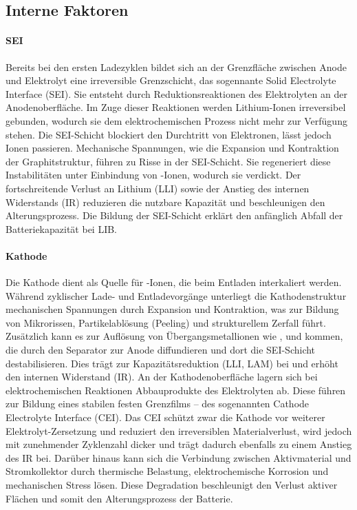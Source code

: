 \subsection{Interne Faktoren}
\paragraph{SEI} Bereits bei den ersten Ladezyklen bildet sich an der Grenzfläche zwischen Anode und Elektrolyt eine irreversible Grenzschicht, das sogennante Solid Electrolyte Interface (SEI). Sie entsteht durch Reduktionsreaktionen des Elektrolyten an der Anodenoberfläche. Im Zuge dieser Reaktionen werden Lithium-Ionen irreversibel gebunden, wodurch sie dem elektrochemischen Prozess nicht mehr zur Verfügung stehen. Die SEI-Schicht blockiert den Durchtritt von Elektronen, lässt jedoch Ionen passieren. Mechanische Spannungen, wie die Expansion und Kontraktion der Graphitstruktur, führen zu Risse in der SEI-Schicht. Sie regeneriert diese Instabilitäten unter Einbindung von -Ionen, wodurch sie verdickt. Der fortschreitende Verlust an Lithium (LLI) sowie der Anstieg des internen Widerstands (IR) reduzieren die nutzbare Kapazität und beschleunigen den Alterungsprozess. Die Bildung der SEI-Schicht erklärt den anfänglich Abfall der Batteriekapazität bei LIB.

\paragraph{Kathode} Die Kathode dient als Quelle für -Ionen, die beim Entladen interkaliert werden. Während zyklischer Lade- und Entladevorgänge unterliegt die Kathodenstruktur mechanischen Spannungen durch Expansion und Kontraktion, was zur Bildung von Mikrorissen, Partikelablösung (Peeling) und strukturellem Zerfall führt. Zusätzlich kann es zur Auflösung von Übergangsmetallionen wie ,  und  kommen, die durch den Separator zur Anode diffundieren und dort die SEI-Schicht destabilisieren. Dies trägt zur Kapazitätsreduktion (LLI, LAM) bei und erhöht den internen Widerstand (IR).
An der Kathodenoberfläche lagern sich bei elektrochemischen Reaktionen Abbauprodukte des Elektrolyten ab. Diese führen zur Bildung eines stabilen festen Grenzfilms – des sogenannten Cathode Electrolyte Interface (CEI). Das CEI schützt zwar die Kathode vor weiterer Elektrolyt-Zersetzung und reduziert den irreversiblen Materialverlust, wird jedoch mit zunehmender Zyklenzahl dicker und trägt dadurch ebenfalls zu einem Anstieg des IR bei.
Darüber hinaus kann sich die Verbindung zwischen Aktivmaterial und Stromkollektor durch thermische Belastung, elektrochemische Korrosion und mechanischen Stress lösen. Diese Degradation beschleunigt den Verlust aktiver Flächen und somit den Alterungsprozess der Batterie.
